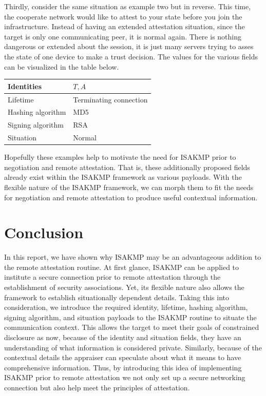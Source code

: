 \documentclass[12pt, letterpaper, twoside]{article}
\begin{document}
Thirdly, consider the same situation as example two but in reverse. This time, the cooperate network would like to attest to your state before you join the infrastructure. Instead of having an extended attestation situation, since the target is only one communicating peer, it is normal again. There is nothing dangerous or extended about the session, it is just many servers trying to asses the state of one device to make a trust decision. The values for the various fields can be visualized in the table below. 

\begin{center}
    \begin{tabular}{ | m{15em} | m{15em}| } 
      \hline
      Identities & $T , A$ \\ 
      \hline
      Lifetime & Terminating connection \\ 
      \hline
      Hashing algorithm & MD5 \\
      \hline
      Signing algorithm & RSA \\
      \hline
      Situation & Normal \\
      \hline
    \end{tabular}
\end{center}

Hopefully these examples help to motivate the need for ISAKMP prior to negotiation and remote attestation. That is, these additionally proposed fields already exist within the ISAKMP framework as various payloads. With the flexible nature of the ISAKMP framework, we can morph them to fit the needs for negotiation and remote attestation to produce useful contextual information.

\section{Conclusion}

In this report, we have shown why ISAKMP may be an advantageous addition to the remote attestation routine. At first glance, ISAKMP can be applied to institute a secure connection prior to remote attestation through the establishment of security associations. Yet, its flexible nature also allows the framework to establish situationally dependent details. Taking this into consideration, we introduce the required identity, lifetime, hashing algorithm, signing algorithm, and situation payloads to the ISAKMP routine to situate the communication context. This allows the target to meet their goals of constrained disclosure as now, because of the identity and situation fields, they have an understanding of what information is considered private. Similarly, because of the contextual details the appraiser can speculate about what it means to have comprehensive information. Thus, by introducing this idea of implementing ISAKMP prior to remote attestation we not only set up a secure networking connection but also help meet the principles of attestation.   
\end{document}
